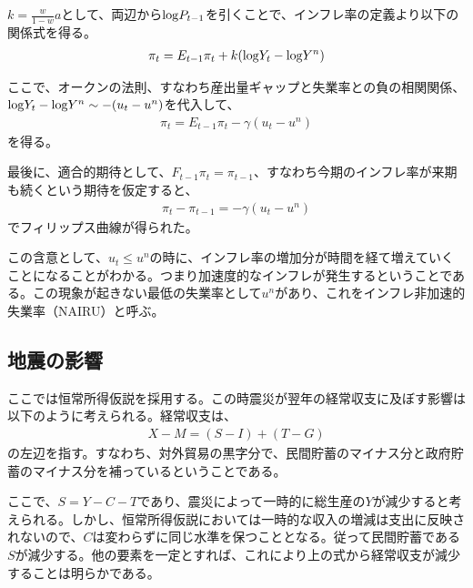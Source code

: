 \documentclass{jsarticle}
\begin{document}
$k = \frac{w}{1 -w} a$として、両辺から${\rm log}P_{t-1}$を引くことで、インフレ率の定義より以下の関係式を得る。
\begin{align}
	\pi_t = E_{t-1}\pi_t + k ({\rm log}Y_t - {\rm log}Y^n)
\end{align}

ここで、オークンの法則、すなわち産出量ギャップと失業率との負の相関関係、${\rm log}Y_t - {\rm log}Y^n \sim -(u_t - u^n)$を代入して、
\begin{align}
	\pi_t = E_{t-1}\pi_t - \gamma (u_t - u^n)
\end{align}
を得る。

最後に、適合的期待として、$F_{t-1}\pi_t = \pi_{t-1}$、すなわち今期のインフレ率が来期も続くという期待を仮定すると、
\begin{align}
	\pi_t - \pi_{t-1}=  - \gamma (u_t - u^n)
\end{align}
でフィリップス曲線が得られた。

この含意として、$u_t \leq u^n$の時に、インフレ率の増加分が時間を経て増えていくことになることがわかる。つまり加速度的なインフレが発生するということである。この現象が起きない最低の失業率として$u^n$があり、これをインフレ非加速的失業率（NAIRU）と呼ぶ。

\subsection{地震の影響}
ここでは恒常所得仮説を採用する。この時震災が翌年の経常収支に及ぼす影響は以下のように考えられる。経常収支は、
\begin{align}
	X - M = (S - I) + (T - G)
\end{align}
の左辺を指す。すなわち、対外貿易の黒字分で、民間貯蓄のマイナス分と政府貯蓄のマイナス分を補っているということである。

ここで、$S = Y - C - T$であり、震災によって一時的に総生産の$Y$が減少すると考えられる。しかし、恒常所得仮説においては一時的な収入の増減は支出に反映されないので、$C$は変わらずに同じ水準を保つこととなる。従って民間貯蓄である$S$が減少する。他の要素を一定とすれば、これにより上の式から経常収支が減少することは明らかである。
\end{document}
